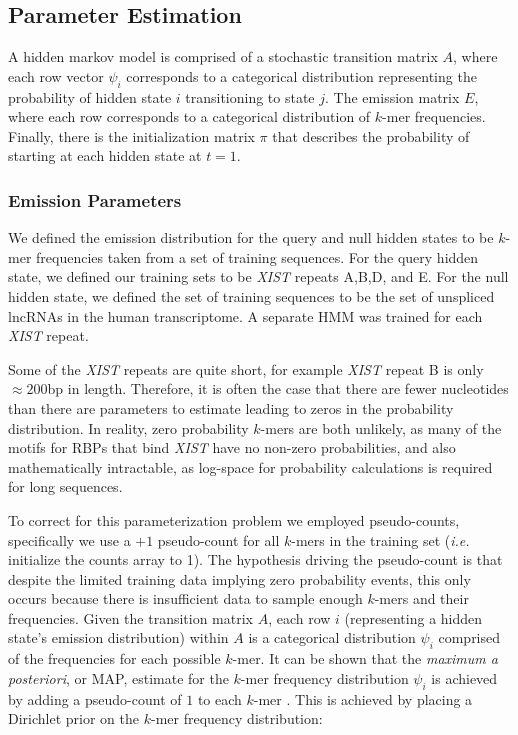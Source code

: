 \subsection{Parameter Estimation}
A hidden markov model is comprised of a stochastic transition matrix $A$, where each row vector $\psi_i$ corresponds to a categorical distribution representing the probability of hidden state $i$ transitioning to state $j$. The emission matrix $E$, where each row corresponds to a categorical distribution of $k$-mer frequencies. Finally, there is the initialization matrix $\pi$ that describes the probability of starting at each hidden state at $t=1$.
\subsubsection{Emission Parameters}
We defined the emission distribution for the query and null hidden states to be $k$-mer frequencies taken from a set of training sequences. For the query hidden state, we defined our training sets to be \emph{XIST} repeats A,B,D, and E. For the null hidden state, we defined the set of training sequences to be the set of unspliced lncRNAs in the human transcriptome. A separate HMM was trained for each \emph{XIST} repeat. 

Some of the \emph{XIST} repeats are quite short, for example \emph{XIST} repeat B is only $\approx 200$bp in length. Therefore, it is often the case that there are fewer nucleotides than there are parameters to estimate leading to zeros in the probability distribution. In reality, zero probability $k$-mers are both unlikely, as many of the motifs for RBPs that bind \emph{XIST} have no non-zero probabilities, and also mathematically intractable, as log-space for probability calculations is required for long sequences.

To correct for this parameterization problem we employed pseudo-counts, specifically we use a $+1$ pseudo-count for all $k$-mers in the training set (\emph{i.e.} initialize the counts array to 1). The hypothesis driving the pseudo-count is that despite the limited training data implying zero probability events, this only occurs because there is insufficient data to sample enough $k$-mers and their frequencies. Given the transition matrix $A$, each row $i$ (representing a hidden state's emission distribution) within $A$ is a categorical distribution $\psi_i $ comprised of the frequencies for each possible $k$-mer. It can be shown that the \emph{maximum a posteriori}, or MAP, estimate for the $k$-mer frequency distribution $\psi_i$ is achieved by adding a pseudo-count of $1$ to each $k$-mer \cite{Rabiner1989ARecognition}. This is achieved by placing a Dirichlet prior on the $k$-mer frequency distribution:

